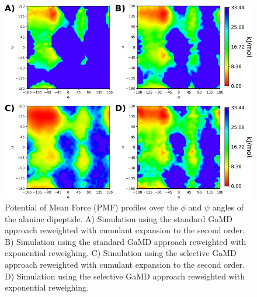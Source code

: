 \begin{figure}[H]
\centering
\includegraphics[scale=.43]{../07_tutorial_04/figures/pmf_tutorial}
\caption{Potential of Mean Force (PMF) profiles over the $\phi$ and $\psi$ angles of the alanine dipeptide. A) Simulation using the standard GaMD approach reweighted with cumulant expansion to the second order. B) Simulation using the standard GaMD approach reweighted with exponential reweighing. C) Simulation using the selective GaMD approach reweighted with cumulant expansion to the second order. D) Simulation using the selective GaMD approach reweighted with exponential reweighing. }
\label{aladip_pmf}
\end{figure}



